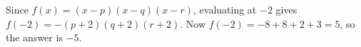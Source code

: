 Since $f(x)=(x-p)(x-q)(x-r)$, evaluating at $-2$ gives $f(-2)=-(p+2)(q+2)(r+2)$. Now $f(-2)=-8+8+2+3=5$, so the answer is $\boxed{-5}$.
